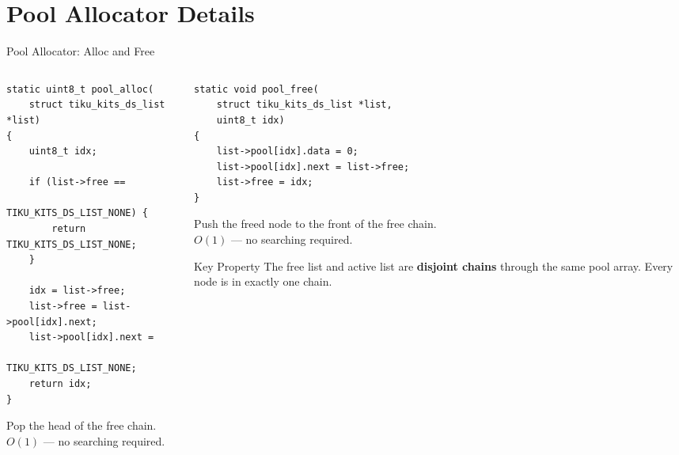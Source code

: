 \documentclass[aspectratio=169, 10pt]{beamer}
\begin{document}
\section{Pool Allocator Details}

\begin{frame}[fragile]{Pool Allocator: Alloc and Free}
\begin{columns}[T]
\begin{column}{0.48\textwidth}
\begin{lstlisting}[style=cstyle,
  title={pool\_alloc --- pop from free list}]
static uint8_t pool_alloc(
    struct tiku_kits_ds_list *list)
{
    uint8_t idx;

    if (list->free ==
            TIKU_KITS_DS_LIST_NONE) {
        return TIKU_KITS_DS_LIST_NONE;
    }

    idx = list->free;
    list->free = list->pool[idx].next;
    list->pool[idx].next =
        TIKU_KITS_DS_LIST_NONE;
    return idx;
}
\end{lstlisting}

Pop the head of the free chain.\\
$O(1)$ --- no searching required.
\end{column}

\begin{column}{0.48\textwidth}
\begin{lstlisting}[style=cstyle,
  title={pool\_free --- push to free list}]
static void pool_free(
    struct tiku_kits_ds_list *list,
    uint8_t idx)
{
    list->pool[idx].data = 0;
    list->pool[idx].next = list->free;
    list->free = idx;
}
\end{lstlisting}

Push the freed node to the front of the free chain.\\
$O(1)$ --- no searching required.

\vspace{0.5em}
\begin{alertblock}{Key Property}
The free list and active list are \textbf{disjoint chains}
through the same pool array. Every node is in exactly one chain.
\end{alertblock}
\end{column}
\end{columns}
\end{frame}
\end{document}
